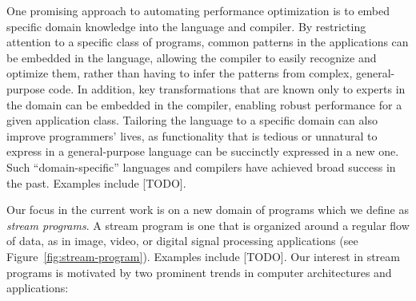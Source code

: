 
One promising approach to automating performance optimization is to
embed specific domain knowledge into the language and compiler.  By
restricting attention to a specific class of programs, common patterns
in the applications can be embedded in the language, allowing the
compiler to easily recognize and optimize them, rather than having to
infer the patterns from complex, general-purpose code.  In addition,
key transformations that are known only to experts in the domain can
be embedded in the compiler, enabling robust performance for a given
application class.  Tailoring the language to a specific domain can
also improve programmers' lives, as functionality that is tedious or
unnatural to express in a general-purpose language can be succinctly
expressed in a new one.  Such ``domain-specific'' languages and
compilers have achieved broad success in the past.  Examples include
[TODO].

Our focus in the current work is on a new domain of programs which we
define as {\it stream programs}.  A stream program is one that is
organized around a regular flow of data, as in image, video, or
digital signal processing applications (see
Figure~\ref{fig:stream-program}).  Examples include [TODO]. Our
interest in stream programs is motivated by two prominent trends in
computer architectures and applications:

